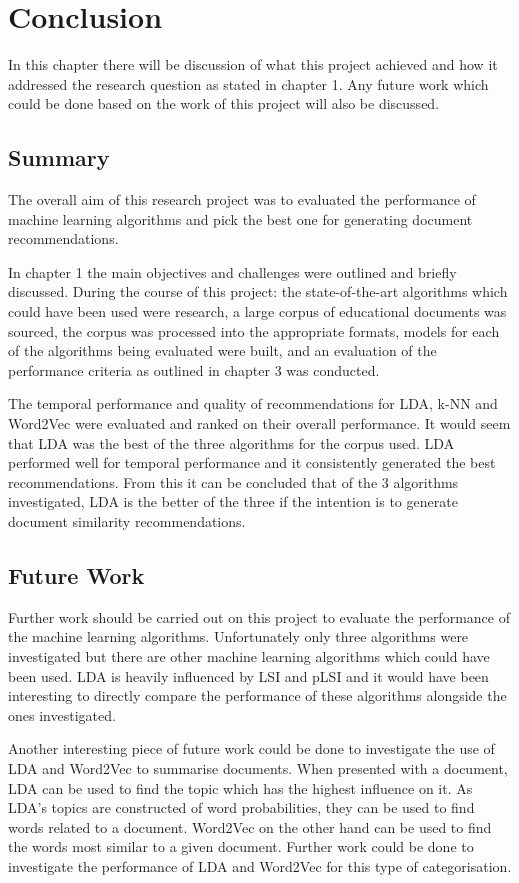 \chapter{Conclusion}
In this chapter there will be discussion of what this project achieved and how it addressed the research question as stated in chapter 1.
Any future work which could be done based on the work of this project will also be discussed.

\section{Summary}
The overall aim of this research project was to evaluated the performance of machine learning algorithms and pick the best one for generating document recommendations.

In chapter 1 the main objectives and challenges were outlined and briefly discussed.
During the course of this project: the state-of-the-art algorithms which could have been used were research, a large corpus of educational documents was sourced, the corpus was processed into the appropriate formats, models for each of the algorithms being evaluated were built, and an evaluation of the performance criteria as outlined in chapter 3 was conducted.

The temporal performance and quality of recommendations for LDA, k-NN and Word2Vec were evaluated and ranked on their overall performance.
It would seem that LDA was the best of the three algorithms for the corpus used.
LDA performed well for temporal performance and it consistently generated the best recommendations.
From this it can be concluded that of the 3 algorithms investigated, LDA is the better of the three if the intention is to generate document similarity recommendations.

\section{Future Work}
Further work should be carried out on this project to evaluate the performance of the machine learning algorithms.
Unfortunately only three algorithms were investigated but there are other machine learning algorithms which could have been used.
LDA is heavily influenced by LSI and pLSI and it would have been interesting to directly compare the performance of these algorithms alongside the ones investigated.

Another interesting piece of future work could be done to investigate the use of LDA and Word2Vec to summarise documents.
When presented with a document, LDA can be used to find the topic which has the highest influence on it.
As LDA's topics are constructed of word probabilities, they can be used to find words related to a document.
Word2Vec on the other hand can be used to find the words most similar to a given document.
Further work could be done to investigate the performance of LDA and Word2Vec for this type of categorisation.
